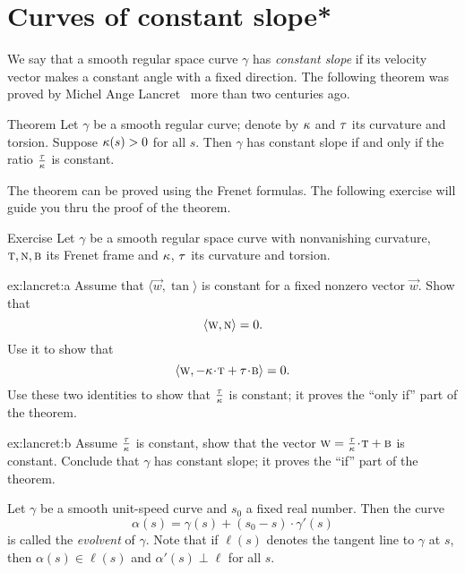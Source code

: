 \section{Curves of constant slope*}

We say that a smooth regular space curve $\gamma$ has \emph{constant slope} if its velocity vector makes a constant angle with a fixed direction.
The following theorem was proved by Michel Ange Lancret~\cite{lancret} more than two centuries ago.

\begin{thm}{Theorem}\label{thm:const-slope}
Let $\gamma$ be a smooth regular curve;
denote by $\kappa$ and $\tau$ its curvature and torsion.
Suppose $\kappa(s)>0$ for all $s$.
Then $\gamma$ has constant slope if and only if the ratio $\tfrac{\tau}{\kappa}$ is constant.
\end{thm}

The theorem can be proved using the Frenet formulas.
The following exercise will guide you thru the proof of the theorem. 

\begin{thm}{Exercise} \label{ex:lancret}
Let $\gamma$ be a smooth regular space curve with nonvanishing curvature, $\textsc{t},\textsc{n},\textsc{b}$ 
its Frenet frame and $\kappa$, $\tau$ its curvature and torsion.

\begin{subthm}{ex:lancret:a}
Assume that  $\langle \vec w,\tan\rangle$ is constant for a fixed nonzero vector $\vec w$.
Show that 
\[\langle \textsc w, \textsc{n}\rangle =0.\]
Use it to show that 
\[\langle \vec w, -\kur\cdot\tan+\tor\cdot \bi\rangle =0.\]
Use these two identities to show that $\tfrac{\tau}{\kappa}$ is constant;
it proves the ``only if'' part of the theorem.
\end{subthm}

\begin{subthm}{ex:lancret:b} Assume $\tfrac{\tau}{\kappa}$ is constant, show that the vector $\vec w=\tfrac\tor\kur\cdot \tan+\bi$ is constant.
Conclude that $\gamma$ has constant slope; it proves the ``if'' part of the theorem.
\end{subthm}

\end{thm}

Let $\gamma$ be a smooth unit-speed curve and $s_0$ a fixed real number. 
Then the curve 
\[\alpha(s)=\gamma(s)+(s_0-s)\cdot \gamma'(s)\]
is called the \emph{evolvent} of $\gamma$.
Note that if $\ell(s)$ denotes the tangent line to $\gamma$ at $s$,
then $\alpha(s)\in \ell(s)$ and $\alpha'(s)\perp \ell$ for all $s$.

